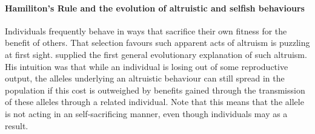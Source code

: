 \paragraph{Hamiliton's Rule and the evolution of altruistic and selfish behaviours}
Individuals frequently behave in ways that sacrifice their own fitness for the
benefit of others. That selection favours such apparent acts of altruism is puzzling at first sight. \citet{hamilton1964genetical,hamilton1964genetical2} supplied the first general evolutionary explanation of such altruism. 
His intuition was that while an individual is losing out of some reproductive output, the alleles underlying an altruistic behaviour can still spread in the population if this cost is outweighed by benefits gained 
through the transmission of these alleles through a related individual. Note that this means that the
allele is not acting in an self-sacrificing manner, even though individuals may as a result. 
